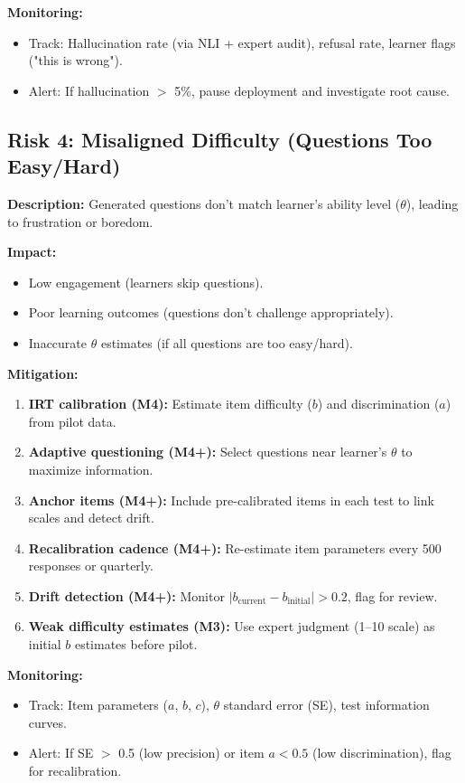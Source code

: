 \documentclass[11pt,letterpaper]{article}
\begin{document}
\textbf{Monitoring:}
\begin{itemize}
\item Track: Hallucination rate (via NLI + expert audit), refusal rate, learner flags ("this is wrong").
\item Alert: If hallucination $>$ 5\%, pause deployment and investigate root cause.
\end{itemize}

\subsection{Risk 4: Misaligned Difficulty (Questions Too Easy/Hard)}\label{subsec:risk-4-difficulty}

\textbf{Description:} Generated questions don't match learner's ability level ($\theta$), leading to frustration or boredom.

\textbf{Impact:}
\begin{itemize}
\item Low engagement (learners skip questions).
\item Poor learning outcomes (questions don't challenge appropriately).
\item Inaccurate $\theta$ estimates (if all questions are too easy/hard).
\end{itemize}

\textbf{Mitigation:}
\begin{enumerate}
\item \textbf{IRT calibration (M4):} Estimate item difficulty ($b$) and discrimination ($a$) from pilot data.
\item \textbf{Adaptive questioning (M4+):} Select questions near learner's $\theta$ to maximize information.
\item \textbf{Anchor items (M4+):} Include pre-calibrated items in each test to link scales and detect drift.
\item \textbf{Recalibration cadence (M4+):} Re-estimate item parameters every 500 responses or quarterly.
\item \textbf{Drift detection (M4+):} Monitor $|b_{\text{current}} - b_{\text{initial}}| > 0.2$, flag for review.
\item \textbf{Weak difficulty estimates (M3):} Use expert judgment (1--10 scale) as initial $b$ estimates before pilot.
\end{enumerate}

\textbf{Monitoring:}
\begin{itemize}
\item Track: Item parameters ($a$, $b$, $c$), $\theta$ standard error (SE), test information curves.
\item Alert: If SE $>$ 0.5 (low precision) or item $a < 0.5$ (low discrimination), flag for recalibration.
\end{itemize}
\end{document}
